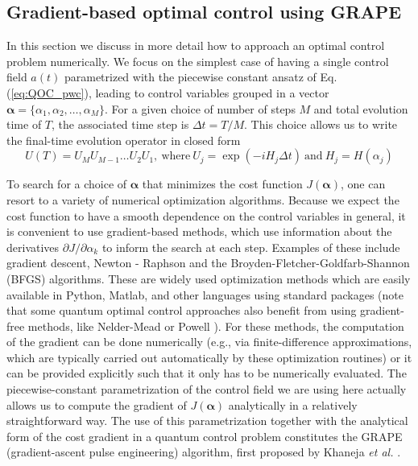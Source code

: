 \subsection{Gradient-based optimal control using GRAPE} \label{subsec:QOC_grape}
In this section we discuss in more detail how to approach an optimal control problem numerically. We focus on the simplest case of having a single control field $a(t)$ parametrized with the piecewise constant ansatz of Eq. (\ref{eq:QOC_pwc}), leading to control variables grouped in a vector $\bm{\alpha}=\{\alpha_1,\alpha_2,\ldots,\alpha_M\}$. For a given choice of number of steps $M$ and total evolution time of $T$, the associated time step is $\Delta t=T/M$. This choice allows us to write the final-time evolution operator in closed form
\begin{equation}
    U(T) = U_M U_{M-1} \ldots U_2 U_1,\ \text{where}\  U_j = \exp\left(-iH_j\Delta t\right)\ \text{and}\ H_j =H(\alpha_j)
\end{equation}

To search for a choice of $\bm{\alpha}$ that minimizes the cost function $J(\bm{\alpha})$, one can resort to a variety of numerical optimization algorithms. Because we expect the cost function to have a smooth dependence on the control variables in general, it is convenient to use gradient-based methods, which use information about the derivatives $\partial J/\partial \alpha_k$ to inform the search at each step. Examples of these include gradient descent, Newton - Raphson and the Broyden-Fletcher-Goldfarb-Shannon (BFGS) algorithms. These are widely used optimization methods which are easily available in Python, Matlab, and other languages using standard packages (note that some quantum optimal control approaches also benefit from using gradient-free methods, like Nelder-Mead or Powell \cite{doria2011_crab,COLD_PRXQ}). For these methods, the computation of the gradient can be done numerically (e.g., via finite-difference approximations, which are typically carried out automatically by these optimization routines) or it can be provided explicitly such that it only has to be numerically evaluated. The piecewise-constant parametrization of the control field we are using here actually allows us to compute the gradient of $J(\bm{\alpha})$ analytically in a relatively straightforward way. The use of this parametrization together with the analytical form of the cost gradient in a quantum control problem constitutes the GRAPE (gradient-ascent pulse engineering) algorithm, first proposed by Khaneja \textit{et al.} \cite{khaneja2005}. 

